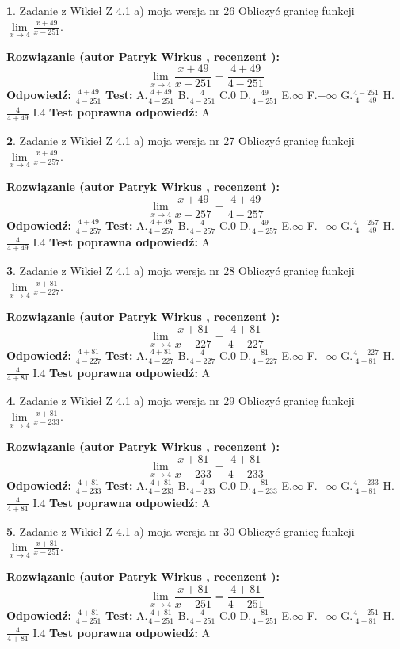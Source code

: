 \documentclass[12pt, a4paper]{article}
\theoremstyle{definition} %
\newtheorem{zad}{}
\newcommand{\zadStart}[1]{\begin{zad}#1\newline}
\newcommand{\zadStop}{\end{zad}}
\newcommand{\rozwStart}[2]{\noindent \textbf{Rozwiązanie (autor #1 , recenzent #2): }\newline}
\newcommand{\rozwStop}{\newline}
\newcommand{\odpStart}{\noindent \textbf{Odpowiedź:}\newline}
\newcommand{\odpStop}{\newline}
\newcommand{\testStart}{\noindent \textbf{Test:}\newline}
\newcommand{\testStop}{\newline}
\newcommand{\kluczStart}{\noindent \textbf{Test poprawna odpowiedź:}\newline}
\newcommand{\kluczStop}{\newline}
\begin{document}
\zadStart{Zadanie z Wikieł Z 4.1 a) moja wersja nr 26}
Obliczyć granicę funkcji $\lim\limits_{x\to4}\frac{x+49}{x-251}$.
\zadStop
\rozwStart{Patryk Wirkus}{}
$$\lim\limits_{x\to4}\frac{x+49}{x-251} = \frac{4+49}{4-251}$$
\rozwStop
\odpStart
$\frac{4+49}{4-251}$
\odpStop
\testStart
A.$\frac{4+49}{4-251}$
B.$\frac{4}{4-251}$
C.$0$
D.$\frac{49}{4-251}$
E.$\infty$
F.$-\infty$
G.$\frac{4-251}{4+49}$
H.$\frac{4}{4+49}$
I.$4$
\testStop
\kluczStart
A
\kluczStop



\zadStart{Zadanie z Wikieł Z 4.1 a) moja wersja nr 27}
Obliczyć granicę funkcji $\lim\limits_{x\to4}\frac{x+49}{x-257}$.
\zadStop
\rozwStart{Patryk Wirkus}{}
$$\lim\limits_{x\to4}\frac{x+49}{x-257} = \frac{4+49}{4-257}$$
\rozwStop
\odpStart
$\frac{4+49}{4-257}$
\odpStop
\testStart
A.$\frac{4+49}{4-257}$
B.$\frac{4}{4-257}$
C.$0$
D.$\frac{49}{4-257}$
E.$\infty$
F.$-\infty$
G.$\frac{4-257}{4+49}$
H.$\frac{4}{4+49}$
I.$4$
\testStop
\kluczStart
A
\kluczStop



\zadStart{Zadanie z Wikieł Z 4.1 a) moja wersja nr 28}
Obliczyć granicę funkcji $\lim\limits_{x\to4}\frac{x+81}{x-227}$.
\zadStop
\rozwStart{Patryk Wirkus}{}
$$\lim\limits_{x\to4}\frac{x+81}{x-227} = \frac{4+81}{4-227}$$
\rozwStop
\odpStart
$\frac{4+81}{4-227}$
\odpStop
\testStart
A.$\frac{4+81}{4-227}$
B.$\frac{4}{4-227}$
C.$0$
D.$\frac{81}{4-227}$
E.$\infty$
F.$-\infty$
G.$\frac{4-227}{4+81}$
H.$\frac{4}{4+81}$
I.$4$
\testStop
\kluczStart
A
\kluczStop



\zadStart{Zadanie z Wikieł Z 4.1 a) moja wersja nr 29}
Obliczyć granicę funkcji $\lim\limits_{x\to4}\frac{x+81}{x-233}$.
\zadStop
\rozwStart{Patryk Wirkus}{}
$$\lim\limits_{x\to4}\frac{x+81}{x-233} = \frac{4+81}{4-233}$$
\rozwStop
\odpStart
$\frac{4+81}{4-233}$
\odpStop
\testStart
A.$\frac{4+81}{4-233}$
B.$\frac{4}{4-233}$
C.$0$
D.$\frac{81}{4-233}$
E.$\infty$
F.$-\infty$
G.$\frac{4-233}{4+81}$
H.$\frac{4}{4+81}$
I.$4$
\testStop
\kluczStart
A
\kluczStop



\zadStart{Zadanie z Wikieł Z 4.1 a) moja wersja nr 30}
Obliczyć granicę funkcji $\lim\limits_{x\to4}\frac{x+81}{x-251}$.
\zadStop
\rozwStart{Patryk Wirkus}{}
$$\lim\limits_{x\to4}\frac{x+81}{x-251} = \frac{4+81}{4-251}$$
\rozwStop
\odpStart
$\frac{4+81}{4-251}$
\odpStop
\testStart
A.$\frac{4+81}{4-251}$
B.$\frac{4}{4-251}$
C.$0$
D.$\frac{81}{4-251}$
E.$\infty$
F.$-\infty$
G.$\frac{4-251}{4+81}$
H.$\frac{4}{4+81}$
I.$4$
\testStop
\kluczStart
A
\kluczStop
\end{document}
